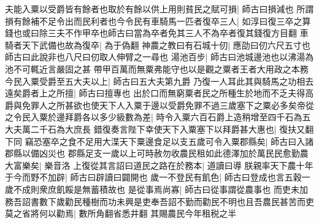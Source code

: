 夫能入粟以受爵皆有餘者也取於有餘以供上用則貧民之賦可損|{
	師古曰損減也}
所謂損有餘補不足令出而民利者也今令民有車騎馬一匹者復卒三人|{
	如淳曰復三卒之算錢也或曰除三夫不作甲卒也師古曰當為卒者免其三人不為卒者復其錢復方目翻}
車騎者天下武備也故為復卒|{
	為于偽翻}
神農之教曰有石城十仞|{
	應劭曰仞六尺五寸也師古曰此說非也八尺曰仞取人伸臂之一尋也}
湯池百步|{
	師古曰池城邊池也以沸湯為池不可輒近言嚴固之甚}
帶甲百萬而無粟弗能守也以是觀之粟者王者大用政之本務今民入粟受爵至五大夫以上|{
	師古曰五大夫第九爵}
乃復一人耳此其與騎馬之功相去遠矣爵者上之所擅|{
	師古曰擅專也}
出於口而無窮粟者民之所種生於地而不乏夫得高爵與免罪人之所甚欲也使天下人入粟于邊以受爵免罪不過三歲塞下之粟必多矣帝從之令民入粟於邊拜爵各以多少級數為差|{
	時令入粟六百石爵上造稍增至四千石為五大夫萬二千石為大庶長}
錯復奏言陛下幸使天下入粟塞下以拜爵甚大惠也|{
	復扶又翻下同}
竊恐塞卒之食不足用大渫天下粟邊食足以支五歲可令入粟郡縣矣|{
	師古曰入諸郡縣以備凶災也}
郡縣足支一歲以上可時赦勿收農民租如此德澤加於萬民民愈勤農大富樂矣|{
	樂音洛}
上復從其言詔曰道民之路在於務本|{
	道讀曰導}
朕親率天下農十年于今而野不加辟|{
	師古曰辟讀曰闢開也}
歲一不登民有飢色|{
	師古曰登成也言五穀一歲不成則衆庶飢餒是無蓄積故也}
是從事焉尚寡|{
	師古曰從事謂從農事也}
而吏未加務吾詔書數下歲勸民種樹而功未興是吏奉吾詔不勤而勸民不明也且吾農民甚苦而吏莫之省將何以勸焉|{
	數所角翻省悉井翻}
其賜農民今年租税之半


